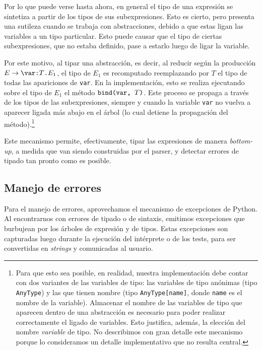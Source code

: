 \documentclass[11pt]{article}
\begin{document}
Por lo que puede verse hasta ahora, en general el tipo de una expresión
se sintetiza a partir de los tipos de sus subexpresiones. Esto es cierto, pero
presenta una sutileza cuando se trabaja con abstracciones, debido a que estas
ligan las variables a un tipo particular. Esto puede causar que el tipo de
ciertas subexpresiones, que no estaba definido, pase a estarlo luego de ligar
la variable.

Por este motivo, al tipar una abstracción, es decir, al reducir según la
producción $E \rightarrow \verb|\var:| T \verb|.| E_1$, el tipo de
$E_1$ es recomputado reemplazando por $T$ el tipo de todas las apariciones de
\verb|var|. En la implementación, esto se realiza ejecutando sobre el tipo de 
$E_1$ el método $\verb|bind(var, |T\verb|)|$. Este proceso se propaga a través
de los tipos de las subexpresiones, siempre y cuando la variable \verb|var|
no vuelva a aparecer ligada más abajo en el árbol (lo cual detiene la
propagación del método).\footnote{Para que esto sea posible, en 
realidad, nuestra implementación debe contar con dos variantes de las
variables de tipo: las variables de tipo anónimas (tipo \texttt{AnyType}) y
las que tienen nombre (tipo \texttt{AnyType[name]}, donde \texttt{name} es el
nombre de la variable). Almacenar el nombre de las variables de tipo que
aparecen dentro de una abstracción es necesario para poder realizar
correctamente el ligado de variables. Esto justifica, además, la elección del
nombre \emph{variable} de tipo. No describimos con gran detalle este mecanismo
porque lo consideramos un detalle implementativo que no resulta central.}


Este mecanismo permite, efectivamente, tipar las expresiones de manera
\emph{bottom-up}, a medida que van siendo construidas por el parser, y
detectar errores de tipado tan pronto como es posible.


\subsection{Manejo de errores}

Para el manejo de errores, aprovechamos el mecanismo de excepciones de Python. Al encontrarnos con errores de tipado o de sintaxis, emitimos excepciones que burbujean por los árboles de expresión y de tipos. Estas excepciones son capturadas luego durante la ejecución del intérprete o de los tests, para ser convertidas en \emph{strings} y comunicadas al usuario.
\end{document}
